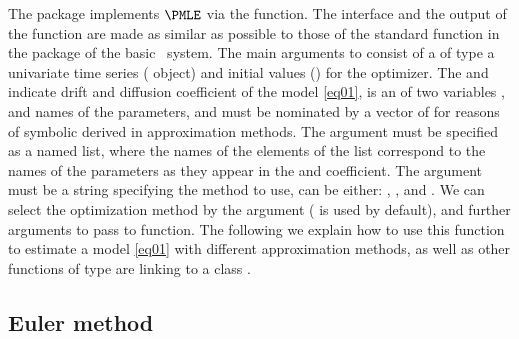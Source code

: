The  package implements $\PMLE$ via the  function. The interface and the output of the  function are made as similar as possible to those of the standard  function in the  package of the basic \R~system. The main arguments to  consist of a  of type a univariate time series ( object) and initial values () for the optimizer. The  and  indicate drift and diffusion coefficient of the model \eqref{eq01}, is an  of two variables ,  and  names of the parameters, and must be nominated by a vector of  for reasons of symbolic derived in approximation methods. The  argument must be specified as a named list, where the names of the elements of the list correspond to the names of the parameters as they appear in the  and  coefficient. The  argument must be a  string specifying the method to use, can be either: , ,  and . We can select the optimization method by the argument  ( is used by default), and further arguments to pass to  function. The following we explain how to use this function to estimate a model \eqref{eq01} with different approximation methods, as well as other functions of type  are linking to a class .

\subsection{Euler method}

